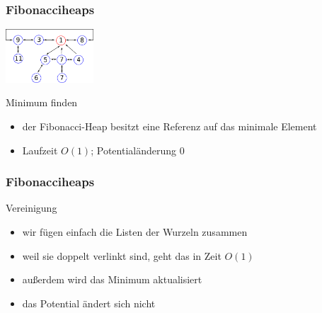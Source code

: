 \documentclass[aspectratio=1610, 11pt]{beamer}
\newcommand{\mytitle}{Fibonacciheaps}
\begin{document}
\begin{frame}\frametitle{\mytitle}
	\hfill\includegraphics[height=20mm]{images/fibo3.pdf}
	\begin{overprint}
\begin{exampleblock}{Minimum finden}
		\begin{itemize}
			\item der Fibonacci-Heap besitzt eine Referenz auf das minimale Element
			\item Laufzeit $O(1)$; Potential\"anderung $0$
		\end{itemize}
	\end{exampleblock}	
	\end{overprint}
\end{frame}

\begin{frame}\frametitle{\mytitle}
	\begin{overprint}
		\onslide<1>
\begin{exampleblock}{Vereinigung}
		\begin{itemize}
			\item wir f\"ugen einfach die Listen der Wurzeln zusammen
			\item weil sie doppelt verlinkt sind, geht das in Zeit $O(1)$
			\item au\ss erdem wird das Minimum aktualisiert
			\item das Potential \"andert sich nicht
		\end{itemize}
	\end{exampleblock}	
	\end{overprint}
\end{frame}
\end{document}
